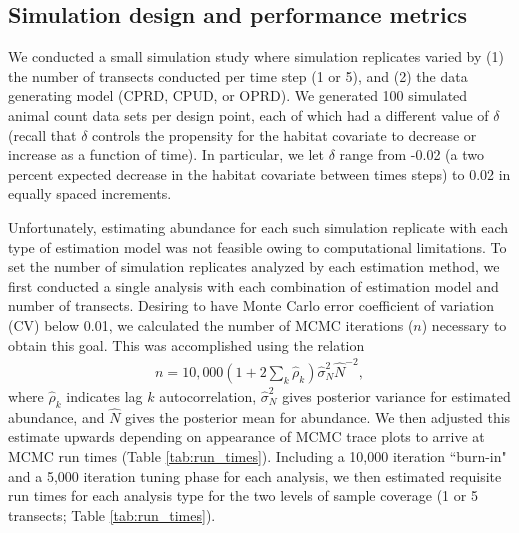 \documentclass[12pt,fleqn]{article}
\begin{document}
\begin{flushleft}
\subsection{Simulation design and performance metrics}

We conducted a small simulation study where simulation replicates varied by (1) the number of transects conducted per time step (1 or 5), and (2) the data generating model (CPRD, CPUD, or OPRD).  We generated 100 simulated animal count data sets per design point, each of which had a different value of $\delta$ (recall that $\delta$ controls the propensity for the habitat covariate to decrease or increase as a function of time).  In particular, we let $\delta$ range from -0.02 (a two percent expected decrease in the habitat covariate between times steps) to 0.02 in equally spaced increments.

\hspace{.5in} Unfortunately, estimating abundance for each such simulation replicate with each type of estimation model was not feasible owing to computational limitations.  To set the number of simulation replicates analyzed by each estimation method, we first conducted a single analysis with each combination of estimation model and number of transects.  Desiring to have Monte Carlo error coefficient of variation (CV) below 0.01, we calculated the number of MCMC iterations ($n$) necessary to obtain this goal.  This was accomplished using the relation
\begin{eqnarray*}
  n = 10,000(1+2 \sum_k \hat{\rho}_k)\hat{\sigma}_N^2 \hat{N}^{-2},
\end{eqnarray*}
where $\hat{\rho}_k$ indicates lag $k$ autocorrelation, $\hat{\sigma}_N^2$ gives posterior variance for
estimated abundance, and $\hat{N}$ gives the posterior mean for abundance.  We then adjusted this estimate upwards depending on appearance of MCMC trace plots to arrive at MCMC run times (Table \ref{tab:run_times}).  Including a 10,000 iteration ``burn-in" and a 5,000 iteration tuning phase for each analysis, we then estimated requisite run times for each analysis type for the two levels of sample coverage (1 or 5 transects; Table \ref{tab:run_times}).


\end{flushleft}
\end{document}
